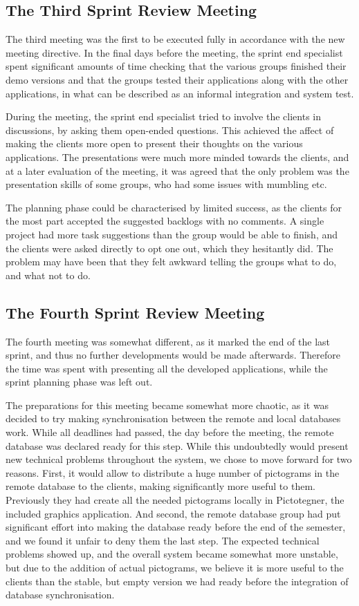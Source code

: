 \subsection{The Third Sprint Review Meeting}
\label{collab:sprintend:three}
The third meeting was the first to be executed fully in accordance with the new meeting directive. In the final days before the meeting, the sprint end specialist spent significant amounts of time checking that the various groups finished their demo versions and that the groups tested their applications along with the other applications, in what can be described as an informal integration and system test. 

During the meeting, the sprint end specialist tried to involve the clients in discussions, by asking them open-ended questions. This achieved the affect of making the clients more open to present their thoughts on the various applications. The presentations were much more minded towards the clients, and at a later evaluation of the meeting, it was agreed that the only problem was the presentation skills of some groups, who had some issues with mumbling etc.

The planning phase could be characterised by limited success, as the clients for the most part accepted the suggested backlogs with no comments. A single project had more task suggestions than the group would be able to finish, and the clients were asked directly to opt one out, which they hesitantly did. The problem may have been that they felt awkward telling the groups what to do, and what not to do.

\subsection{The Fourth Sprint Review Meeting}
\label{collab:sprintend:four}
The fourth meeting was somewhat different, as it marked the end of the last sprint, and thus no further developments would be made afterwards. Therefore the time was spent with presenting all the developed applications, while the sprint planning phase was left out. 

The preparations for this meeting became somewhat more chaotic, as it was decided to try making synchronisation between the remote and local databases work. While all deadlines had passed, the day before the meeting, the remote database was declared ready for this step. While this undoubtedly would present new technical problems throughout the system, we chose to move forward for two reasons. First, it would allow to distribute a huge number of pictograms in the remote database to the clients, making \giraf significantly more useful to them. Previously they had create all the needed pictograms locally in Pictotegner, the included graphics application. And second, the remote database group had put significant effort into making the database ready before the end of the semester, and we found it unfair to deny them the last step. The expected technical problems showed up, and the overall system became somewhat more unstable, but due to the addition of actual pictograms, we believe it is more useful to the clients than the stable, but empty version we had ready before the integration of database synchronisation.

